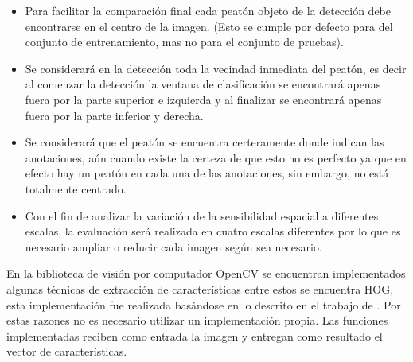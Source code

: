 \begin{itemize}
\item Para facilitar la comparación final cada peatón objeto de la detección debe encontrarse en el centro de la imagen. (Esto se cumple por defecto para del conjunto de entrenamiento, mas no para el conjunto de pruebas). 

\item Se considerará en la detección toda la vecindad inmediata del peatón, es decir al comenzar la detección la ventana de clasificación se encontrará apenas fuera por la parte superior e izquierda y al finalizar se encontrará apenas fuera por la parte inferior y derecha.

\item Se considerará que el peatón se encuentra certeramente donde indican las anotaciones, aún cuando existe la certeza de que esto no es perfecto ya que en efecto hay un peatón en cada una de las anotaciones, sin embargo, no está totalmente centrado.

\item Con el fin de analizar la variación de la sensibilidad espacial a diferentes escalas, la evaluación será realizada en cuatro escalas diferentes por lo que es necesario ampliar o reducir cada imagen según sea necesario. 
\end{itemize}


En la biblioteca de visión por computador OpenCV se encuentran implementados algunas técnicas de extracción de características entre estos se encuentra HOG, esta implementación fue realizada basándose en lo descrito en el trabajo de \cite{dalal2006}. Por estas razones no es necesario utilizar un implementación propia. Las funciones implementadas reciben como entrada la imagen y entregan como resultado el vector de características.


